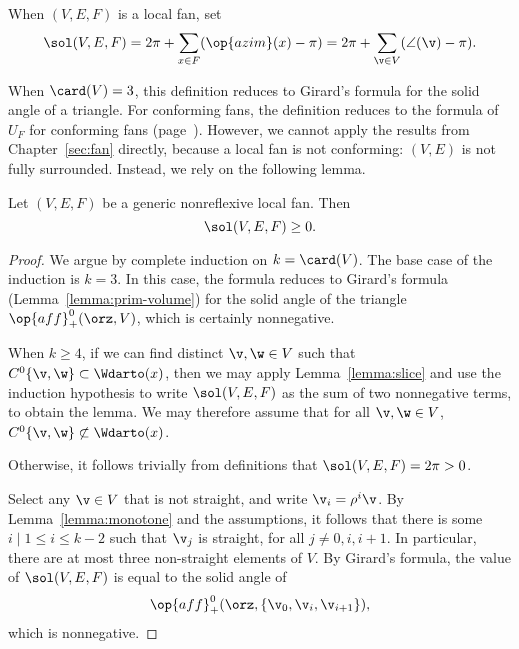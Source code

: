 \begin{definition}  When $(V,E,F)$ is a local fan, set
\[
\sol(V,E,F) =  2\pi + \sum_{x\in F}(\op{azim}(x)-\pi) = 2\pi + \sum_{\v\in V} (\angle(\v) -\pi).
\]
\end{definition}
%

When $\card(V)=3$, this definition reduces to Girard's formula for the
solid angle of a triangle.  For conforming fans, the definition
reduces to the  formula of $U_F$ for conforming fans
(page~\pageref{def:conforming}).  However, we cannot apply the results
from Chapter~\ref{sec:fan} directly, because a local fan is not
conforming: $(V,E)$ is not fully surrounded. Instead, we rely on the
following lemma.


\begin{lemma}\label{lemma:sol-local}
Let $(V,E,F)$ be a generic nonreflexive local fan.  Then
\[
\sol(V,E,F) \ge 0.  %
\]
\end{lemma}

\begin{proof} 
  We argue by complete induction on $k=\card(V)$.  The base case of
  the induction is $k=3$.  In this case, the formula reduces to
  Girard's formula (Lemma~\ref{lemma:prim-volume}) for the solid angle
  of the triangle $\op{aff}_+^0(\orz,V)$, which is certainly
  nonnegative.

  When $k\ge4$, if we can find distinct $\v,\w\in V$ such that
  $C^0\{\v,\w\}\subset \Wdarto(x)$, then we may apply
  Lemma~\ref{lemma:slice} and use the induction hypothesis to write
  $\sol(V,E,F)$ as the sum of two nonnegative terms, to obtain the
  lemma.  We may therefore assume that for all $\v,\w\in V$,
  $C^0\{\v,\w\}\not\subset \Wdarto(x)$.

  Otherwise,
it follows trivially from definitions that $\sol(V,E,F)=2\pi>0$.

Select any $\v\in V$ that is not straight, and write $\v_i = \rho^i\v$.  By
Lemma~\ref{lemma:monotone} and the assumptions, it follows that there
is some $i\mid 1 \le i \le k-2$ such that $\v_j$ is straight, for all
$j\ne 0,i,i+1$.  In particular, there are at most three non-straight
elements of $V$.  By Girard's formula, the value of $\sol(V,E,F)$ is
equal to the solid angle of
\[
\op{aff}_+^0(\orz,\{\v_0,\v_i,\v_{i+1}\}),
\]
which is nonnegative.
\end{proof}



